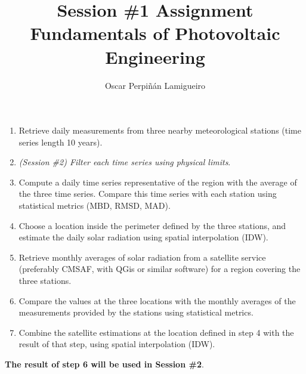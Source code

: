 \documentclass[11pt]{article}
\author{Oscar Perpiñán Lamigueiro}
\date{}
\title{Session \#1 Assignment\\\medskip
\large Fundamentals of Photovoltaic Engineering}
\begin{document}
\maketitle
\begin{enumerate}
\item Retrieve daily measurements from three nearby meteorological stations (time series length 10 years).
\item \emph{(Session \#2) Filter each time series using physical limits}.
\item Compute a daily time series representative of the region with the average of the three time series. Compare this time series with each station using statistical metrics (MBD, RMSD, MAD).
\item Choose a location inside the perimeter defined by the three stations, and estimate the daily solar radiation using spatial interpolation (IDW).
\item Retrieve monthly averages of solar radiation from a satellite service (preferably CMSAF, with QGis or similar software) for a region covering the three stations.
\item Compare the values at the three locations with the monthly averages of the measurements provided by the stations using statistical metrics.
\item Combine the satellite estimations at the location defined in step 4 with the result of that step, using spatial interpolation (IDW).
\end{enumerate}

\textbf{The result of step 6 will be used in Session \#2}.
\end{document}
